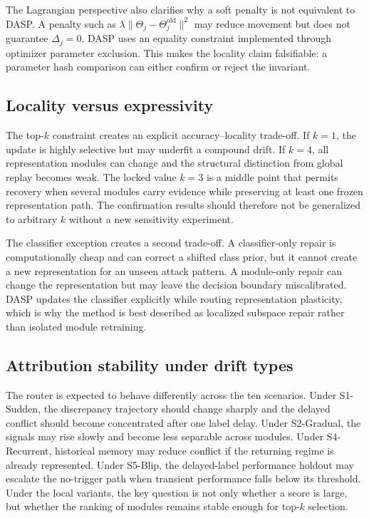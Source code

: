 The Lagrangian perspective also clarifies why a soft penalty is not equivalent to DASP. A penalty such as $\lambda\lVert\Theta_j-\Theta_j^{\mathrm{old}}\rVert^2$ may reduce movement but does not guarantee $\Delta_j=0$. DASP uses an equality constraint implemented through optimizer parameter exclusion. This makes the locality claim falsifiable: a parameter hash comparison can either confirm or reject the invariant.
\subsection{Locality versus expressivity}
The top-$k$ constraint creates an explicit accuracy--locality trade-off. If $k=1$, the update is highly selective but may underfit a compound drift. If $k=4$, all representation modules can change and the structural distinction from global replay becomes weak. The locked value $k=3$ is a middle point that permits recovery when several modules carry evidence while preserving at least one frozen representation path. The confirmation results should therefore not be generalized to arbitrary $k$ without a new sensitivity experiment.

The classifier exception creates a second trade-off. A classifier-only repair is computationally cheap and can correct a shifted class prior, but it cannot create a new representation for an unseen attack pattern. A module-only repair can change the representation but may leave the decision boundary miscalibrated. DASP updates the classifier explicitly while routing representation plasticity, which is why the method is best described as localized subspace repair rather than isolated module retraining.

\subsection{Attribution stability under drift types}
The router is expected to behave differently across the ten scenarios. Under S1-Sudden, the discrepancy trajectory should change sharply and the delayed conflict should become concentrated after one label delay. Under S2-Gradual, the signals may rise slowly and become less separable across modules. Under S4-Recurrent, historical memory may reduce conflict if the returning regime is already represented. Under S5-Blip, the delayed-label performance holdout may escalate the no-trigger path when transient performance falls below its threshold. Under the local variants, the key question is not only whether a score is large, but whether the ranking of modules remains stable enough for top-$k$ selection.

